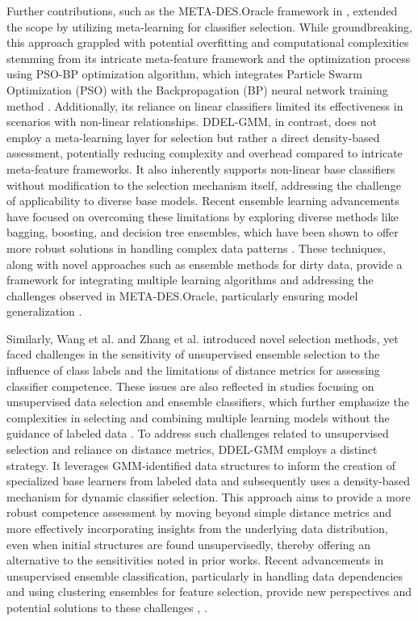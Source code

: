 \documentclass[lettersize,journal]{IEEEtran}
\newcommand{\greenhighlight}[1]{\textcolor{highlightgreen}{#1}}
\begin{document}
Further contributions, such as the META-DES.Oracle framework in \cite{cruz_meta-oracle_2017}, extended the scope by utilizing meta-learning for classifier selection. While groundbreaking, this approach grappled with potential overfitting and computational complexities stemming from its intricate meta-feature framework and the optimization process using PSO-BP optimization algorithm, which integrates Particle Swarm Optimization (PSO) with the Backpropagation (BP) neural network training method \cite{al-andoli_ensemble-based_2023}. Additionally, its reliance on linear classifiers limited its effectiveness in scenarios with non-linear relationships. \greenhighlight{DDEL-GMM, in contrast, does not employ a meta-learning layer for selection but rather a direct density-based assessment, potentially reducing complexity and overhead compared to intricate meta-feature frameworks. It also inherently supports non-linear base classifiers without modification to the selection mechanism itself, addressing the challenge of applicability to diverse base models.} Recent ensemble learning advancements have focused on overcoming these limitations by exploring diverse methods like bagging, boosting, and decision tree ensembles, which have been shown to offer more robust solutions in handling complex data patterns \cite{sagi_ensemble_2018}. These techniques, along with novel approaches such as ensemble methods for dirty data, provide a framework for integrating multiple learning algorithms and addressing the challenges observed in META-DES.Oracle, particularly ensuring model generalization \cite{liu_ensemble_2023}.

Similarly, Wang et al. \cite{wang_ensemble_2021} and Zhang et al. \cite{zhang_distance-based_2019} introduced novel selection methods, yet faced challenges in the sensitivity of unsupervised ensemble selection to the influence of class labels and the limitations of distance metrics for assessing classifier competence. These issues are also reflected in studies focusing on unsupervised data selection and ensemble classifiers, which further emphasize the complexities in selecting and combining multiple learning models without the guidance of labeled data \cite{elmi_novel_2023}. \greenhighlight{To address such challenges related to unsupervised selection and reliance on distance metrics, DDEL-GMM employs a distinct strategy. It leverages GMM-identified data structures to inform the creation of specialized base learners from labeled data and subsequently uses a density-based mechanism for dynamic classifier selection. This approach aims to provide a more robust competence assessment by moving beyond simple distance metrics and more effectively incorporating insights from the underlying data distribution, even when initial structures are found unsupervisedly, thereby offering an alternative to the sensitivities noted in prior works.} Recent advancements in unsupervised ensemble classification, particularly in handling data dependencies and using clustering ensembles for feature selection, provide new perspectives and potential solutions to these challenges \cite{tian_improved_2022}, \cite{traganitis_unsupervised_2022, ayerdi_spatially_2015}.
\end{document}
